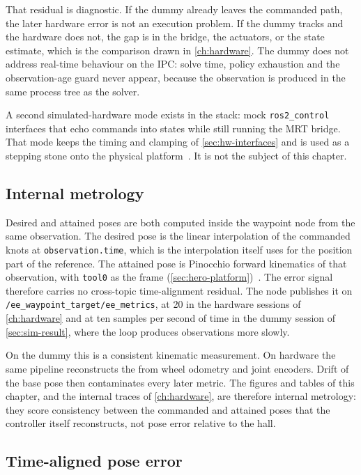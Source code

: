 That residual is diagnostic. If the dummy already leaves the commanded
path, the later hardware error is not an execution problem. If the dummy
tracks and the hardware does not, the gap is in the bridge, the
actuators, or the state estimate, which is the comparison drawn in
\cref{ch:hardware}. The dummy does not address real-time behaviour on
the IPC: solve time, policy exhaustion and the observation-age guard
never appear, because the observation is produced in the same process
tree as the solver.

A second simulated-hardware mode exists in the \hero{} stack: mock
\texttt{ros2\_control} interfaces that echo commands into states while
still running the MRT bridge. That mode keeps the timing and clamping of
\cref{sec:hw-interfaces} and is used as a stepping stone onto the
physical platform~\cite{ros2control}. It is not the subject of this
chapter.

\subsection{Internal metrology}
\label{sec:sim-metrology}

Desired and attained \ee{} poses are both computed inside the waypoint
node from the same \mpc{} observation. The desired pose is the linear
interpolation of the commanded knots at \texttt{observation.time}, which
is the interpolation \ocs{} itself uses for the position part of the
reference. The attained pose is Pinocchio forward kinematics of that
observation, with \texttt{tool0} as the \ee{} frame
(\cref{sec:hero-platform})~\cite{Carpentier2019Pinocchio}. The error
signal therefore carries no cross-topic time-alignment residual. The
node publishes it on \texttt{/ee\_waypoint\_target/ee\_metrics}, at
\qty{20}{\hz} in the hardware sessions of \cref{ch:hardware} and at ten
samples per second of \ocs{} time in the dummy session of
\cref{sec:sim-result}, where the loop produces observations more
slowly.

On the dummy this is a consistent kinematic measurement. On hardware the
same pipeline reconstructs the \ee{} from wheel odometry and joint
encoders. Drift of the base pose then contaminates every later metric.
The figures and tables of this chapter, and the internal traces of
\cref{ch:hardware}, are therefore internal metrology: they score
consistency between the commanded and attained poses that the controller
itself reconstructs, not pose error relative to the hall.

\subsection{Time-aligned pose error}
\label{sec:sim-pose-error}

